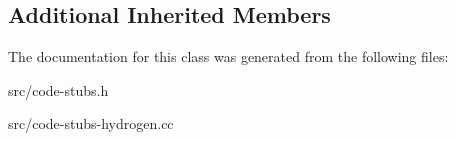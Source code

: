 \subsection*{Additional Inherited Members}


The documentation for this class was generated from the following files\+:\begin{DoxyCompactItemize}
\item 
src/code-\/stubs.\+h\item 
src/code-\/stubs-\/hydrogen.\+cc\end{DoxyCompactItemize}
